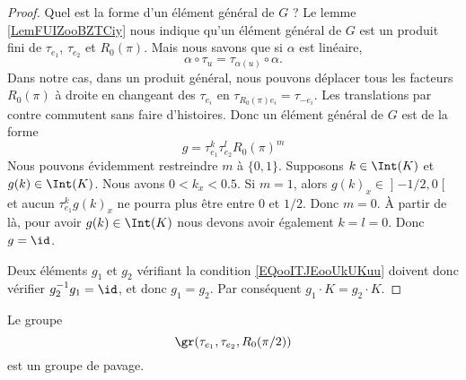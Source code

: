 \begin{proof}
    Quel est la forme d'un élément général de \( G\) ? Le lemme \ref{LemFUIZooBZTCiy} nous indique qu'un élément général de \( G\) est un produit fini de \( \tau_{e_1}\), \( \tau_{e_2}\) et \( R_0(\pi)\). Mais nous savons que si \( \alpha\) est linéaire,
    \begin{equation}
        \alpha\circ \tau_u=\tau_{\alpha(u)}\circ \alpha.
    \end{equation}
    Dans notre cas, dans un produit général, nous pouvons déplacer tous les facteurs \( R_0(\pi)\) à droite en changeant des \( \tau_{e_i}\) en \( \tau_{R_0(\pi)e_i}=\tau_{-e_i}\). Les translations par contre commutent sans faire d'histoires. Donc un élément général de \( G\) est de la forme
    \begin{equation}
        g=\tau_{e_1}^k\tau_{e_2}^lR_0(\pi)^m
    \end{equation}
    Nous pouvons évidemment restreindre \( m\) à \( \{ 0,1 \}\). Supposons \( k\in \Int(K)\) et \( g(k)\in \Int(K)\). Nous avons \( 0<k_x<0.5\). Si \(m=1 \), alors \( g(k)_x\in\mathopen] -1/2 , 0 \mathclose[\) et aucun \( \tau_{e_1}^kg(k)_x\) ne pourra plus être entre \( 0\) et \( 1/2\). Donc \( m=0\). À partir de là, pour avoir \( g(k)\in \Int(K)\) nous devons avoir également \( k=l=0\). Donc \( g=\id\).

    Deux éléments \( g_1\) et \( g_2\) vérifiant la condition \eqref{EQooITJEooUkUKuu} doivent donc vérifier \( g_2^{-1}g_1=\id\), et donc \( g_1=g_2\). Par conséquent \( g_1\cdot K=g_2\cdot K\).
\end{proof}

\newcommand{\CaptionFigATJSooefYkmCbP}{Le compact \( K\) et son image par \( R_0(\pi)\) pour le lemme \ref{LEMooTMRGooChBzZg}.}


\begin{lemma}    
    Le groupe
    \begin{equation}
        \gr(\tau_{e_1}, \tau_{e_2}, R_0(\pi/2))
    \end{equation}
    est un groupe de pavage.
\end{lemma}

